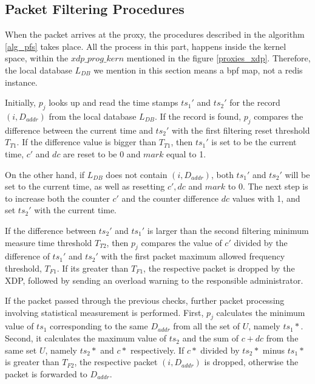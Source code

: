 \documentclass[sigplan,screen]{acmart}
\begin{document}
\subsection{Packet Filtering Procedures}
When the packet arrives at the proxy, the procedures described in the algorithm \ref{alg_pfs} takes place. All the process in this part, happens inside the kernel space, within the $xdp\_prog\_kern$ mentioned in the figure \ref{proxies_xdp}. Therefore, the local database $L_{DB}$ we mention in this section means a bpf map, not a redis instance.

Initially, $p_j$ looks up and read the time stamps $ts_1'$ and $ts_2'$ for the record $(i, D_{addr})$ from the local database $L_{DB}$. If the record is found, $p_j$ compares the difference between the current time and $ts_2'$ with the first filtering reset threshold $T_{T1}$. If the difference value is bigger than $T_{T1}$, then $ts_1'$ is set to be the current time, $c'$ and $dc$ are reset to be 0 and $mark$ equal to 1. 

On the other hand, if $L_{DB}$ does not contain $(i, D_{addr})$, both $ts_1'$ and $ts_2'$ will be set to the current time, as well as resetting $c', dc$ and $mark$ to 0. The next step is to increase both the counter $c'$ and the counter difference $dc$ values with 1, and set $ts_2'$ with the current time. 

If the difference between $ts_2'$ and $ts_1'$ is larger than the second filtering minimum measure time threshold $T_{T2}$, then $p_j$ compares the value of $c'$ divided by the difference of $ts_1'$ and $ts_2'$ with the first packet maximum allowed frequency threshold, $T_{F1}$. If its greater than $T_{F1}$, the respective packet is dropped by the XDP, followed by sending an overload warning to the responsible administrator. 

If the packet passed through the previous checks, further packet processing involving statistical measurement is performed. First, $p_j$ calculates the minimum value of $ts_1$ corresponding to the same $D_{addr}$ from all the set of $U$, namely $ts_1*$. Second, it calculates the maximum value of $ts_2$ and the sum of $c+dc$ from the same set $U$, namely $ts_2*$ and $c*$ respectively. If $c*$ divided by $ts_2*$ minus $ts_1*$ is greater than $T_{F2}$, the respective packet $(i, D_{addr})$ is dropped, otherwise the packet is forwarded to $D_{addr}$.
\end{document}
